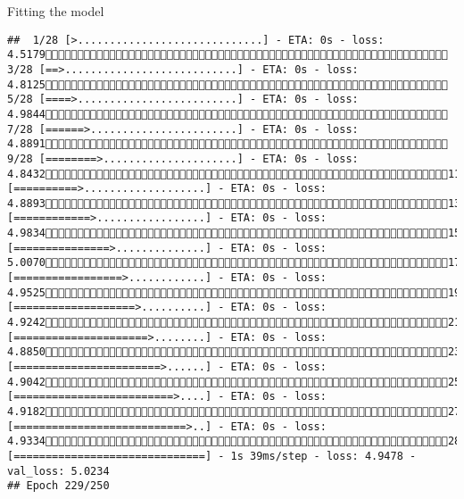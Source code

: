 \documentclass[
  ignorenonframetext,
]{beamer}
\begin{document}
\begin{frame}[fragile]{Fitting the model}
\begin{verbatim}
##  1/28 [>.............................] - ETA: 0s - loss: 4.5179 3/28 [==>...........................] - ETA: 0s - loss: 4.8125 5/28 [====>.........................] - ETA: 0s - loss: 4.9844 7/28 [======>.......................] - ETA: 0s - loss: 4.8891 9/28 [========>.....................] - ETA: 0s - loss: 4.843211/28 [==========>...................] - ETA: 0s - loss: 4.889313/28 [============>.................] - ETA: 0s - loss: 4.983415/28 [===============>..............] - ETA: 0s - loss: 5.007017/28 [=================>............] - ETA: 0s - loss: 4.952519/28 [===================>..........] - ETA: 0s - loss: 4.924221/28 [=====================>........] - ETA: 0s - loss: 4.885023/28 [=======================>......] - ETA: 0s - loss: 4.904225/28 [=========================>....] - ETA: 0s - loss: 4.918227/28 [===========================>..] - ETA: 0s - loss: 4.933428/28 [==============================] - 1s 39ms/step - loss: 4.9478 - val_loss: 5.0234
## Epoch 229/250

\end{verbatim}
\end{frame}
\end{document}
